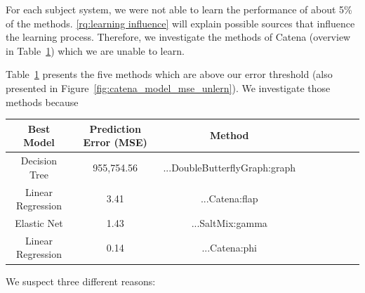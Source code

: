 For each subject system, we were not able to learn the performance of about 5\% of the methods. \ref{rq:learning influence} will explain possible sources that influence the learning process. Therefore, we investigate the methods of Catena (overview in Table~\ref{tbl:unlearnable_methods_catena}) which we are unable to learn. 

Table~\ref{tbl:unlearnable_methods_catena} presents the five methods which are above our error threshold (also presented in Figure~\ref{fig:catena_model_mse_unlern}). We investigate those methods because 


\begin{table}[h]
	\centering %
    \begin{tabular}{*{9}{c}}
    	\toprule
        Best Model 			& Prediction Error (\ac{MSE}) & Method \\
        \toprule
        Decision Tree 		& 955,754.56 				& ...DoubleButterflyGraph:graph \\
        \midrule
		Linear Regression 	& 3.41 						& ...Catena:flap \\
        \midrule
		Elastic Net 		& 1.43 						& ...SaltMix:gamma \\
        \midrule
		Linear Regression 	& 0.14 						& ...Catena:phi \\
        \bottomrule
    \end{tabular}
    \label{tbl:unlearnable_methods_catena}
\end{table}

We suspect three different reasons:

